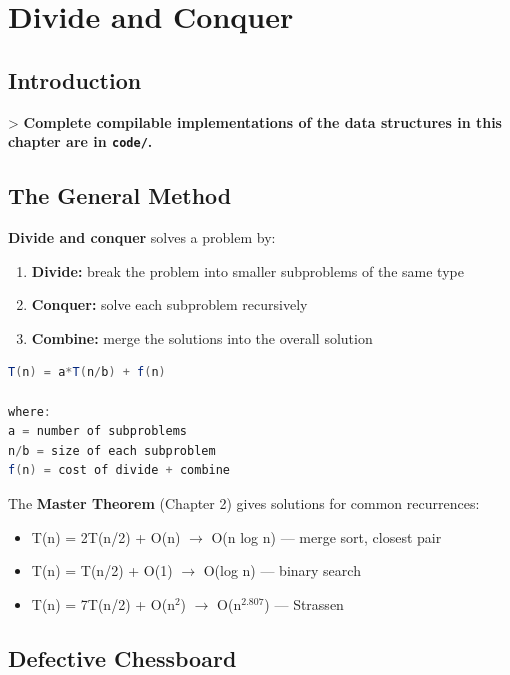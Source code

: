 \chapter{Divide and Conquer}\label{ch16:divide-and-conquer}

\section{Introduction}

> \textbf{Complete compilable implementations of the data structures in this chapter are in \texttt{code/}.}

\section{The General Method}

\textbf{Divide and conquer} solves a problem by:
\begin{enumerate}
\item \textbf{Divide:} break the problem into smaller subproblems of the same type
\item \textbf{Conquer:} solve each subproblem recursively
\item \textbf{Combine:} merge the solutions into the overall solution
\end{enumerate}

\begin{lstlisting}[language=Java]
T(n) = a*T(n/b) + f(n)

where:
a = number of subproblems
n/b = size of each subproblem
f(n) = cost of divide + combine
\end{lstlisting}

The \textbf{Master Theorem} (Chapter 2) gives solutions for common recurrences:
\begin{itemize}
\item T(n) = 2T(n/2) + O(n) $\to$ O(n log n) — merge sort, closest pair
\item T(n) = T(n/2) + O(1) $\to$ O(log n) — binary search
\item T(n) = 7T(n/2) + O(n$^{2}$) $\to$ O(n$^{2.807}$) — Strassen
\end{itemize}

\section{Defective Chessboard}

